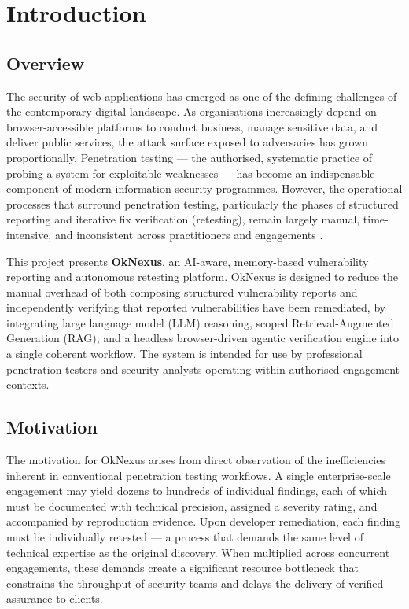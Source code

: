 \chapter{Introduction}

\section{Overview}

The security of web applications has emerged as one of the defining challenges of the contemporary digital landscape. As organisations increasingly depend on browser-accessible platforms to conduct business, manage sensitive data, and deliver public services, the attack surface exposed to adversaries has grown proportionally. Penetration testing --- the authorised, systematic practice of probing a system for exploitable weaknesses --- has become an indispensable component of modern information security programmes. However, the operational processes that surround penetration testing, particularly the phases of structured reporting and iterative fix verification (retesting), remain largely manual, time-intensive, and inconsistent across practitioners and engagements \cite{ptes}.

This project presents \textbf{OkNexus}, an AI-aware, memory-based vulnerability reporting and autonomous retesting platform. OkNexus is designed to reduce the manual overhead of both composing structured vulnerability reports and independently verifying that reported vulnerabilities have been remediated, by integrating large language model (LLM) reasoning, scoped Retrieval-Augmented Generation (RAG), and a headless browser-driven agentic verification engine into a single coherent workflow. The system is intended for use by professional penetration testers and security analysts operating within authorised engagement contexts.

\section{Motivation}

The motivation for OkNexus arises from direct observation of the inefficiencies inherent in conventional penetration testing workflows. A single enterprise-scale engagement may yield dozens to hundreds of individual findings, each of which must be documented with technical precision, assigned a severity rating, and accompanied by reproduction evidence. Upon developer remediation, each finding must be individually retested --- a process that demands the same level of technical expertise as the original discovery. When multiplied across concurrent engagements, these demands create a significant resource bottleneck that constrains the throughput of security teams and delays the delivery of verified assurance to clients.

